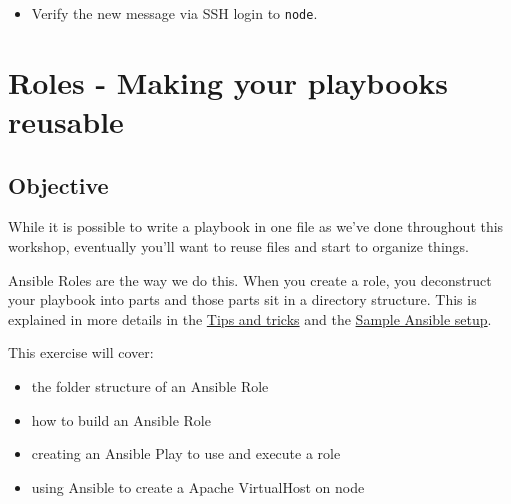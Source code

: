 \begin{itemize}
\tightlist
\item
  Verify the new message via SSH login to \texttt{node}.
\end{itemize}

\begin{Shaded}
\begin{Highlighting}[]
\ExtensionTok{[student@controller}\NormalTok{ \textasciitilde{}]$ ssh 10.3.48.[100+PARTICIPANT\_ID]}
\end{Highlighting}
\end{Shaded}

\hypertarget{roles---making-your-playbooks-reusable}{%
\section{Roles - Making your playbooks
reusable}\label{roles---making-your-playbooks-reusable}}

\hypertarget{objective}{%
\subsection{Objective}\label{objective}}

While it is possible to write a playbook in one file as we've done
throughout this workshop, eventually you'll want to reuse files and
start to organize things.

Ansible Roles are the way we do this. When you create a role, you
deconstruct your playbook into parts and those parts sit in a directory
structure. This is explained in more details in the
\href{https://docs.ansible.com/ansible/latest/user_guide/playbooks_best_practices.html}{Tips
and tricks} and the
\href{https://docs.ansible.com/ansible/latest/user_guide/sample_setup.html}{Sample
Ansible setup}.

This exercise will cover:

\begin{itemize}
\tightlist
\item
  the folder structure of an Ansible Role
\item
  how to build an Ansible Role
\item
  creating an Ansible Play to use and execute a role
\item
  using Ansible to create a Apache VirtualHost on node
\end{itemize}

